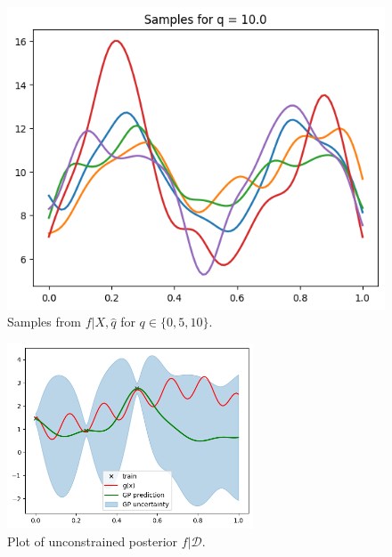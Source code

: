 \begin{figure}[p]
  \begin{subcaptionblock}{.5\textwidth}
    \centering
    \includegraphics[width=\textwidth]{./figures/gp_constr_q10.png}
  \end{subcaptionblock}
  \caption{Samples from $f | X, \hat{q}$ for $q \in \{ 0, 5, 10 \}$.}
  \label{fig:gp:constrained:samples}
\end{figure}

\begin{figure}[p]
  \centering
  \includegraphics[width=0.65\textwidth]{./figures/gp_pred_unconstrained.png}
  \caption{
    Plot of unconstrained posterior $f | \mathcal{D}$.
  }
  \label{fig:gp:pred:unconstrained}
\end{figure}
